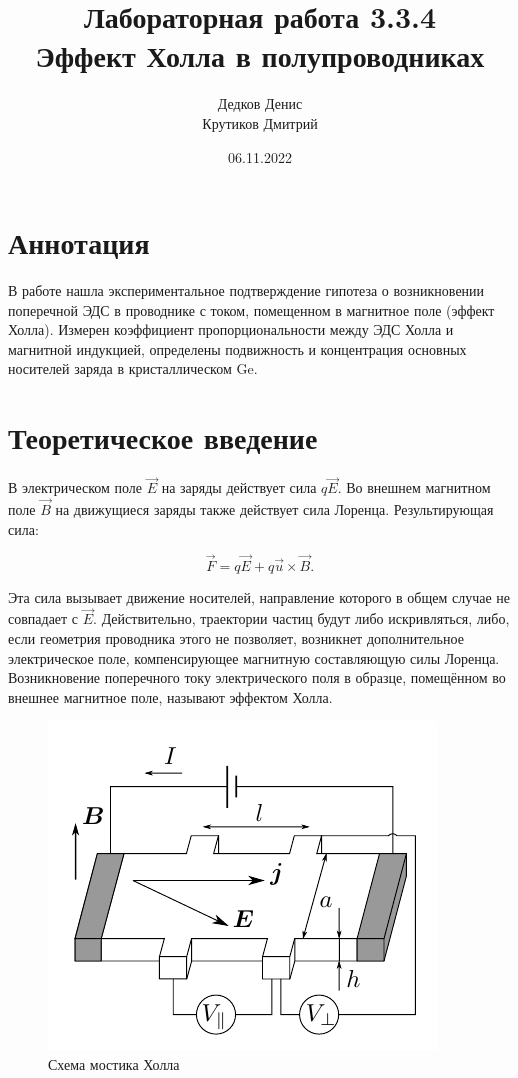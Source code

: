 \documentclass[12pt,a4paper]{article}
\title{Лабораторная работа 3.3.4\\ Эффект Холла в полупроводниках}
\author{Дедков Денис \\ Крутиков Дмитрий}
\date{06.11.2022}
\begin{document}
	\maketitle
	
	\section*{Аннотация}
	
	В работе нашла экспериментальное подтверждение гипотеза о возникновении поперечной ЭДС в проводнике с током, помещенном в магнитное поле (эффект Холла). Измерен коэффициент пропорциональности между ЭДС Холла и магнитной индукцией, определены подвижность и концентрация основных носителей заряда в кристаллическом Ge.
		
	\section*{Теоретическое введение}
	
	В электрическом поле $\vec{E}$ на заряды действует сила $q\vec{E}$. Во внешнем магнитном поле $\vec{B}$ на движущиеся заряды также действует сила Лоренца. Результирующая сила:
	
	$$ \vec{F} = q\vec{E} + q\vec{u} \times \vec{B}.$$
	
	Эта сила вызывает движение носителей, направление которого в общем случае не совпадает с $\vec{E}$. Действительно, траектории частиц будут ли­бо искривляться, либо, если геометрия проводника этого не позволя­ет, возникнет дополнительное электрическое поле, компенсирующее маг­нитную составляющую силы Лоренца. Возникновение поперечного току электрического поля в образце, помещённом во внешнее магнитное поле, называют эффектом Холла.
	
	\begin{figure}[h]
		\includegraphics[scale=0.65]{res/scheme_hall.png}
		\caption{Схема мостика Холла}
		\label{scheme_hall}
	\end{figure}
\end{document}
